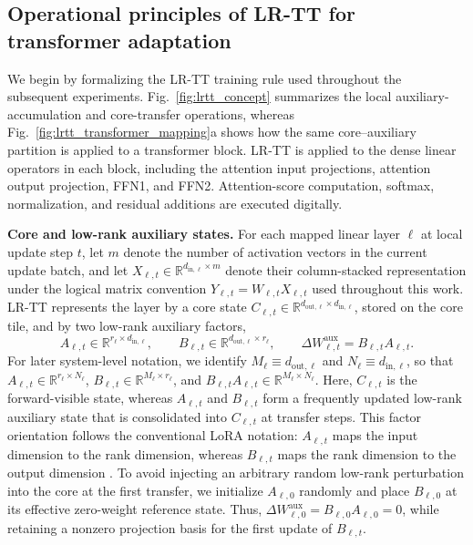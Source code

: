 \documentclass[fleqn,10pt]{wlscirep}
\begin{document}
\subsection{Operational principles of LR-TT for transformer adaptation}
\label{subsec:results_lrtt_formulation}

\noindent
We begin by formalizing the LR-TT training rule used throughout the subsequent experiments.
Fig.~\ref{fig:lrtt_concept} summarizes the local auxiliary-accumulation and core-transfer operations, whereas Fig.~\ref{fig:lrtt_transformer_mapping}a shows how the same core--auxiliary partition is applied to a transformer block.
LR-TT is applied to the dense linear operators in each block, including the attention input projections, attention output projection, FFN1, and FFN2.
Attention-score computation, softmax, normalization, and residual additions are executed digitally.

\noindent\textbf{Core and low-rank auxiliary states.}
For each mapped linear layer \(\ell\) at local update step \(t\), let \(m\) denote the number of activation vectors in the current update batch, and let
\(X_{\ell,t}\in\mathbb{R}^{d_{\mathrm{in},\ell}\times m}\)
denote their column-stacked representation under the logical matrix convention
\(Y_{\ell,t}=W_{\ell,t}X_{\ell,t}\)
used throughout this work.
LR-TT represents the layer by a core state
\(C_{\ell,t}\in\mathbb{R}^{d_{\mathrm{out},\ell}\times d_{\mathrm{in},\ell}}\),
stored on the core tile, and by two low-rank auxiliary factors,
\begin{equation}
A_{\ell,t}
\in
\mathbb{R}^{r_\ell\times d_{\mathrm{in},\ell}},
\qquad
B_{\ell,t}
\in
\mathbb{R}^{d_{\mathrm{out},\ell}\times r_\ell},
\qquad
\Delta W_{\ell,t}^{\mathrm{aux}}
=
B_{\ell,t}A_{\ell,t}.
\label{eq:lrtt_lowrank_parameterization}
\end{equation}
For later system-level notation, we identify
\(M_\ell\equiv d_{\mathrm{out},\ell}\) and
\(N_\ell\equiv d_{\mathrm{in},\ell}\), so that
\(A_{\ell,t}\in\mathbb{R}^{r_\ell\times N_\ell}\),
\(B_{\ell,t}\in\mathbb{R}^{M_\ell\times r_\ell}\), and
\(B_{\ell,t}A_{\ell,t}\in\mathbb{R}^{M_\ell\times N_\ell}\).
Here, \(C_{\ell,t}\) is the forward-visible state, whereas \(A_{\ell,t}\) and \(B_{\ell,t}\) form a frequently updated low-rank auxiliary state that is consolidated into \(C_{\ell,t}\) at transfer steps.
This factor orientation follows the conventional LoRA notation:
\(A_{\ell,t}\) maps the input dimension to the rank dimension, whereas \(B_{\ell,t}\) maps the rank dimension to the output dimension
\cite{hu2021lora}.
To avoid injecting an arbitrary random low-rank perturbation into the core at the first transfer, we initialize \(A_{\ell,0}\) randomly and place \(B_{\ell,0}\) at its effective zero-weight reference state.
Thus, \(\Delta W_{\ell,0}^{\mathrm{aux}}=B_{\ell,0}A_{\ell,0}=0\), while retaining a nonzero projection basis for the first update of \(B_{\ell,t}\).
\end{document}
